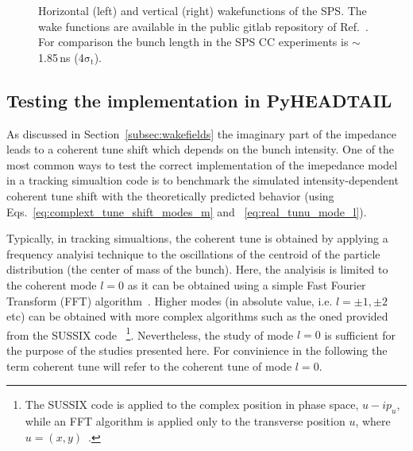 \begin{figure}[!ht]
\begin{subfigure}[t]{0.45\textwidth}
    \end{subfigure}
    \hfill
     \caption{Horizontal (left) and vertical (right) wakefunctions of the SPS. The wake functions are available in the public gitlab repository of Ref.~\cite{sps_impedance_model_git}. For comparison the bunch length in the SPS CC experiments is $\sim$ 1.85\,ns (4$\mathrm{\sigma_t}$).} %
     \label{fig:sps_wakefunctions_model_H_V}
 \end{figure}




\subsection{Testing the implementation in PyHEADTAIL}\label{subsec:test_implementation_pyheatail}
As discussed in Section~\ref{subsec:wakefields} the imaginary part of the impedance leads to a coherent tune shift which depends on the bunch intensity. One of the most common ways to test the correct implementation of the imepedance model in a tracking simualtion code is to benchmark the simulated intensity-dependent coherent tune shift with the theoretically predicted behavior (using Eqs.~\eqref{eq:complext_tune_shift_modes_m} and ~\eqref{eq:real_tunu_mode_l}).

Typically, in tracking simualtions, the coherent tune is obtained by applying a frequency analyisi technique to the oscillations of the centroid of the particle distribution (the center of mass of the bunch). Here, the analyisis is limited to the coherent mode $l=0$ as it can be obtained using a simple Fast Fourier Transform (FFT) algorithm~\cite{FFT_and_applications}. Higher modes (in absolute value, i.e. $l=\pm 1, \pm 2$ etc) can be obtained with more complex algorithms such as the oned provided from the SUSSIX code~\cite{Bartolini:702438} \footnote{The SUSSIX code is applied to the complex position in phase space, $u-i p_u$, while an FFT algorithm is applied only to the transverse position $u$, where $u=(x,y)$~\cite{Salvant:1274254}.}. Nevertheless, the study of mode $l=0$ is sufficient for the purpose of the studies presented here. For convinience in the following the term coherent tune will refer to the coherent tune of mode $l=0$.

